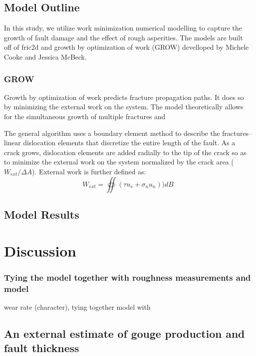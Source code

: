 \documentclass[12pt,a4paper]{article}
\begin{document}
\begin{itemize}
	\subsection{Model Outline}
	
	In this study, we utilize work minimization numerical modelling to capture the growth of fault damage and the effect of rough asperities. The models are built off of fric2d and growth by optimization of work (GROW) develloped by Michele Cooke and Jessica McBeck.
	
		\subsubsection{GROW}
		Growth by optimization of work predicts fracture propagation paths. It does so by minimizing the external work on the system. The model theoretically allows for the simultaneous growth of multiple fractures and 
		
		The general algorithm uses a boundary element method to describe the fractures--linear dislocation elements that discretize the entire length of the fault. As a crack grows, dislocation elements are added radially to the tip of the crack so as to minimize the external work on the system normalized by the crack area ($W_{ext}/\Delta A$). External work is further defined as:
		\begin{equation}
		W_{ext} = \oiint (\tau u_s + \sigma_n u_n))dB
		\end{equation}
		
		
	
	\subsection{Model Results}

\section{Discussion}
	\subsubsection{Tying the model together with roughness measurements and model}
wear rate (character), tying together model with 



	\subsection{An external estimate of gouge production and fault thickness}


\end{itemize}
\end{document}
